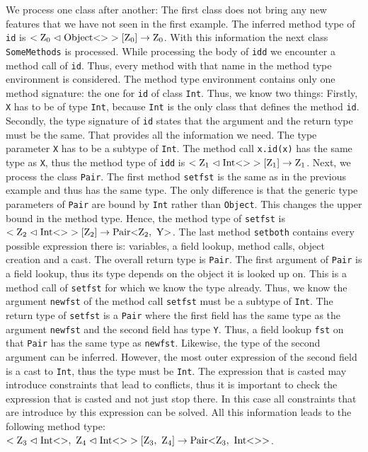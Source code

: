 We process one class after another: The first class does not bring any new features that we have not seen in the first example. The inferred method type of \verb|id| is $<\text{Z}_{0} \vartriangleleft \text{Object} \text{<}  \text{>}>[\text{Z}_{0}] \to \text{Z}_{0}$.
With this information the next class \verb|SomeMethods| is processed. While processing the body of \verb|idd| we encounter a method call of \verb|id|. Thus, every method with that name in the method type environment is considered. The method type environment
contains only one method signature: the one for \verb|id| of class \verb|Int|. Thus, we know two things: Firstly, \verb|X| has to be of type \verb|Int|, because \verb|Int| is the only class that defines the method \verb|id|. Secondly, the type signature of \verb|id| states that the argument and the return type must be the same.
That provides all the information we need. The type parameter \verb|X| has to be a subtype of \verb|Int|. The method call \verb|x.id(x)| has the same type as \verb|X|, thus the method type of \verb|idd| is $<\text{Z}_{1} \vartriangleleft \text{Int} \text{<}  \text{>}>[\text{Z}_{1}] \to \text{Z}_{1}$.
Next, we process the class \verb|Pair|. The first method \verb|setfst| is the same as in the previous example and thus has the same type. The only difference is that the generic type parameters of \verb|Pair| are bound by \verb|Int| rather than \verb|Object|.
This changes the upper bound in the method type. Hence, the method type of \verb|setfst| is $<\text{Z}_{2} \vartriangleleft \text{Int} \text{<}  \text{>}>[\text{Z}_{2}] \to \text{Pair} \text{<} \text{Z}_{2}, \ \text{Y} \text{>}$.
The last method \verb|setboth| contains every possible expression there is: variables, a field lookup, method calls, object creation and a cast.
The overall return type is \verb|Pair|. The first argument of \verb|Pair| is a field lookup, thus its type depends on the object it is looked up on. This is a method call of \verb|setfst| for which we know the type already. Thus, we know the argument \verb|newfst| of the method call \verb|setfst| must be a subtype of \verb|Int|. The return type of \verb|setfst| is a \verb|Pair| where the first field has the same type as the argument \verb|newfst| and the second field has type \verb|Y|.
Thus, a field lookup \verb|fst| on that \verb|Pair| has the same type as \verb|newfst|. Likewise, the type of the second argument can be inferred. However, the most outer expression of the second field is a cast to \verb|Int|, thus the type must be \verb|Int|.
The expression that is casted may introduce constraints that lead to conflicts, thus it is important to check the expression that is casted and not just stop there. In this case all constraints that are introduce by this expression can be solved.
All this information leads to the following method type: $<\xa{Z}{3} \vartriangleleft \nvtt{Int}{}, \ \xa{Z}{4} \vartriangleleft \nvtt{Int}{}>[\xa{Z}{3}, \ \xa{Z}{4}] \to \nvtt{Pair}{\xa{Z}{3}, \ \nvtt{Int}{}}$.
